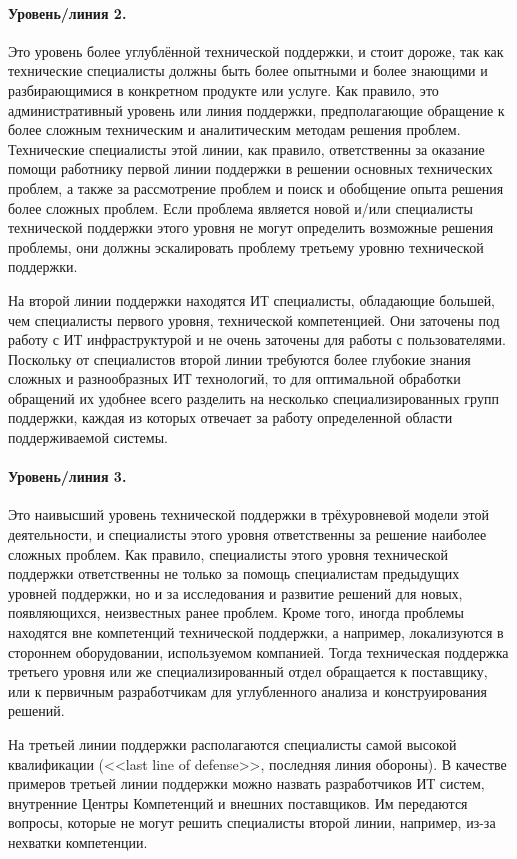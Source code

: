 \documentclass{../../text-style}
\begin{document}
\paragraph{Уровень/линия 2.} Это уровень более углублённой технической поддержки, и стоит дороже, так как технические специалисты должны быть более опытными и более знающими и разбирающимися в конкретном продукте или услуге. Как правило, это административный уровень или линия поддержки, предполагающие обращение к более сложным техническим и аналитическим методам решения проблем. Технические специалисты этой линии, как правило, ответственны за оказание помощи работнику первой линии поддержки в решении основных технических проблем, а также за рассмотрение проблем и поиск и обобщение опыта решения более сложных проблем. Если проблема является новой и/или специалисты технической поддержки этого уровня не могут определить возможные решения проблемы, они должны эскалировать проблему третьему уровню технической поддержки.

На второй линии поддержки находятся ИТ специалисты, обладающие большей, чем специалисты первого уровня, технической компетенцией. Они заточены под работу с ИТ инфраструктурой и не очень заточены для работы с пользователями. Поскольку от специалистов второй линии требуются более глубокие знания сложных и разнообразных ИТ технологий, то для оптимальной обработки обращений их удобнее всего разделить на несколько специализированных групп поддержки, каждая из которых отвечает за работу определенной области поддерживаемой системы.

\paragraph{Уровень/линия 3.} Это наивысший уровень технической поддержки в трёхуровневой модели этой деятельности, и специалисты этого уровня ответственны за решение наиболее сложных проблем. Как правило, специалисты этого уровня технической поддержки ответственны не только за помощь специалистам предыдущих уровней поддержки, но и за исследования и развитие решений для новых, появляющихся, неизвестных ранее проблем. Кроме того, иногда проблемы находятся вне компетенций технической поддержки, а например, локализуются в стороннем оборудовании, используемом компанией. Тогда техническая поддержка третьего уровня или же специализированный отдел обращается к поставщику, или к первичным разработчикам для углубленного анализа и конструирования решений.

На третьей линии поддержки располагаются специалисты самой высокой квалификации (<<last line of defense>>, последняя линия обороны). В качестве примеров третьей линии поддержки можно назвать разработчиков ИТ систем, внутренние Центры Компетенций и внешних поставщиков. Им передаются вопросы, которые не могут решить специалисты второй линии, например, из-за нехватки компетенции.
\end{document}
